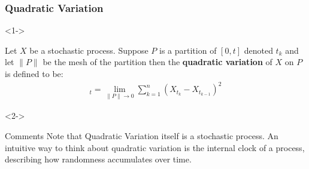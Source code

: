 \documentclass[10pt]{beamer}
\begin{document}
\begin{frame}[t]
  \frametitle{Quadratic Variation}
  \begin{onlyenv}<1->
    \begin{definition}
      Let $X$ be a stochastic process. Suppose $P$ is a partition of $[0,t]$ denoted $t_k$ and let $\lVert P \rVert$ be the mesh of the partition then the \textbf{quadratic variation} of $X$ on $P$ is defined to be:
          \begin{align*}
            [X]_t = \lim\limits_{\lVert P \rVert \to 0} \displaystyle\sum_{k = 1}^{n}(X_{t_k} - X_{t_{k-1}})^2
          \end{align*}
    \end{definition}
  \end{onlyenv}
  \begin{onlyenv}<2->
    \begin{block}{Comments}
      Note that Quadratic Variation itself is a stochastic process. An intuitive way to think about quadratic variation is the internal clock of a process, describing how randomness accumulates over time.
    \end{block}
  \end{onlyenv}
\end{frame}
\end{document}
